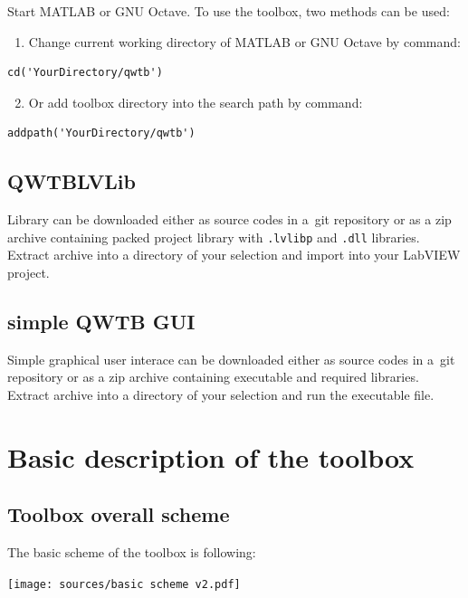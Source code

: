 \documentclass[12pt,a4paper,oneside]{report} %
\def\matlab{{\sc MATLAB}\xspace}
\def\octave{{\sc GNU Octave}\xspace}
\def\labview{{\sc LabVIEW}\xspace}
\begin{document}
Start \matlab or \octave. To use the toolbox, two methods can be used:
\begin{enumerate}
        \item Change current working directory of \matlab or \octave by command:
\end{enumerate}

\begin{lstlisting}
cd('YourDirectory/qwtb')
\end{lstlisting}

\begin{enumerate}
        \setcounter{enumi}{1}
        \item Or add toolbox directory into the search path by command:
\end{enumerate}
\begin{lstlisting}
addpath('YourDirectory/qwtb')
\end{lstlisting}

\section{QWTBLVLib} %
Library can be downloaded either as source codes in a~{\sc git} repository or as a zip archive
containing packed project library with {\tt .lvlibp} and {\tt .dll} libraries. Extract archive into
a directory of your selection and import into your \labview project. 

\section{simple QWTB GUI} %
Simple graphical user interace can be downloaded either as source codes in a~{\sc git} repository or
as a zip archive containing executable and required libraries. Extract archive into a directory of
your selection and run the executable file.

\chapter{Basic description of the toolbox} %
\section{Toolbox overall scheme} %
The basic scheme of the toolbox is following:
\begin{center}
        \texttt{[image: sources/basic scheme v2.pdf]}
\end{center}
\end{document}
